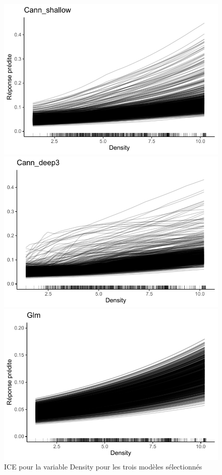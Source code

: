\begin{figure}
\caption{\label{fig:ice3Density} ICE pour la variable Density pour les trois modèles sélectionnés}
\centering
\begin{minipage}{0.45\linewidth}
\includegraphics[scale=0.6]{Graphiques/iceDensityShallow}
\end{minipage}
\hfill
\begin{minipage}{0.45\linewidth}
\includegraphics[scale=0.6]{Graphiques/iceDensityCann}
\end{minipage}
\hfill
\begin{minipage}{0.45\linewidth}
\includegraphics[scale=0.6]{Graphiques/iceDensityGlm}

\end{minipage}
\end{figure}

